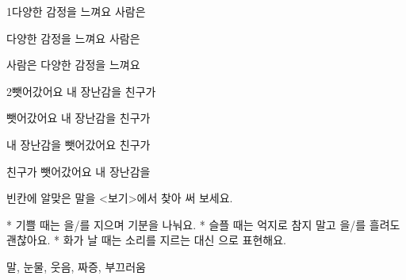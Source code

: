 \documentclass[fs13,seriesSau]{korfarm-base}
\begin{document}
\kfActivityBg \par{}
\par{}\par\nopagebreak[4]\smallskip\nopagebreak[4]
\begin{kfSentenceUnit}{1}{다양한 감정을 느껴요 사람은}
\begin{kfChoices}
\kfChoice 다양한 감정을
\kfChoice 느껴요
\kfChoice 사람은
\end{kfChoices}
\begin{kfChoices}
\kfChoice 사람은
\kfChoice 다양한 감정을
\kfChoice 느껴요
\end{kfChoices}
\end{kfSentenceUnit}

\begin{kfSentenceUnit}{2}{뺏어갔어요 내 장난감을 친구가}
\begin{kfChoices}
\kfChoice 뺏어갔어요
\kfChoice 내 장난감을
\kfChoice 친구가
\end{kfChoices}
\begin{kfChoices}
\kfChoice 내 장난감을
\kfChoice 뺏어갔어요
\kfChoice 친구가
\end{kfChoices}
\begin{kfChoices}
\kfChoice 친구가
\kfChoice 뺏어갔어요
\kfChoice 내 장난감을
\end{kfChoices}
\end{kfSentenceUnit}

\kfActivityBg \par{}\par\nopagebreak[4]\smallskip\nopagebreak[4]
\begin{kfBlankList}
\kfBlankItem 빈칸에 알맞은 말을 <보기>에서 찾아 써 보세요.

* 기쁠 때는 \kfFillBlank[42mm]{}을/를 지으며 기분을 나눠요. * 슬플 때는 억지로 참지 말고 \kfFillBlank[42mm]{}을/를 흘려도 괜찮아요. * 화가 날 때는 소리를 지르는 대신 \kfFillBlank[42mm]{}으로 표현해요.
\begin{kfEvidence}말, 눈물, 웃음, 짜증, 부끄러움\end{kfEvidence}
\end{kfBlankList}
\end{document}

